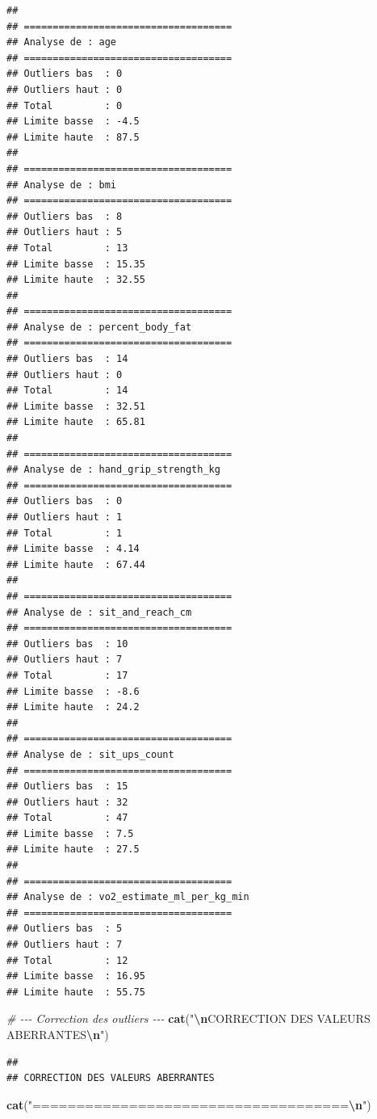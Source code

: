 \documentclass[
]{article}
\newenvironment{Shaded}{\begin{snugshade}}{\end{snugshade}}
\newcommand{\CommentTok}[1]{\textcolor[rgb]{0.56,0.35,0.01}{\textit{#1}}}
\newcommand{\FunctionTok}[1]{\textcolor[rgb]{0.13,0.29,0.53}{\textbf{#1}}}
\newcommand{\NormalTok}[1]{#1}
\newcommand{\SpecialCharTok}[1]{\textcolor[rgb]{0.81,0.36,0.00}{\textbf{#1}}}
\newcommand{\StringTok}[1]{\textcolor[rgb]{0.31,0.60,0.02}{#1}}
\begin{document}
\begin{verbatim}
## 
## ====================================
## Analyse de : age 
## ====================================
## Outliers bas  : 0 
## Outliers haut : 0 
## Total         : 0 
## Limite basse  : -4.5 
## Limite haute  : 87.5 
## 
## ====================================
## Analyse de : bmi 
## ====================================
## Outliers bas  : 8 
## Outliers haut : 5 
## Total         : 13 
## Limite basse  : 15.35 
## Limite haute  : 32.55 
## 
## ====================================
## Analyse de : percent_body_fat 
## ====================================
## Outliers bas  : 14 
## Outliers haut : 0 
## Total         : 14 
## Limite basse  : 32.51 
## Limite haute  : 65.81 
## 
## ====================================
## Analyse de : hand_grip_strength_kg 
## ====================================
## Outliers bas  : 0 
## Outliers haut : 1 
## Total         : 1 
## Limite basse  : 4.14 
## Limite haute  : 67.44 
## 
## ====================================
## Analyse de : sit_and_reach_cm 
## ====================================
## Outliers bas  : 10 
## Outliers haut : 7 
## Total         : 17 
## Limite basse  : -8.6 
## Limite haute  : 24.2 
## 
## ====================================
## Analyse de : sit_ups_count 
## ====================================
## Outliers bas  : 15 
## Outliers haut : 32 
## Total         : 47 
## Limite basse  : 7.5 
## Limite haute  : 27.5 
## 
## ====================================
## Analyse de : vo2_estimate_ml_per_kg_min 
## ====================================
## Outliers bas  : 5 
## Outliers haut : 7 
## Total         : 12 
## Limite basse  : 16.95 
## Limite haute  : 55.75
\end{verbatim}

\begin{Shaded}
\begin{Highlighting}[]
\CommentTok{\# {-}{-}{-} Correction des outliers {-}{-}{-}}
\FunctionTok{cat}\NormalTok{(}\StringTok{"}\SpecialCharTok{\textbackslash{}n}\StringTok{CORRECTION DES VALEURS ABERRANTES}\SpecialCharTok{\textbackslash{}n}\StringTok{"}\NormalTok{)}
\end{Highlighting}
\end{Shaded}

\begin{verbatim}
## 
## CORRECTION DES VALEURS ABERRANTES
\end{verbatim}

\begin{Shaded}
\begin{Highlighting}[]
\FunctionTok{cat}\NormalTok{(}\StringTok{"====================================}\SpecialCharTok{\textbackslash{}n}\StringTok{"}\NormalTok{)}
\end{Highlighting}
\end{Shaded}
\end{document}
